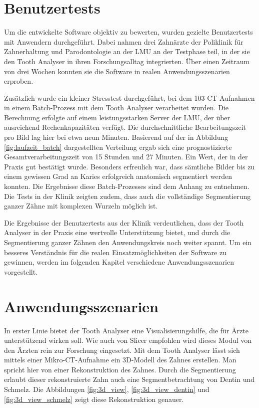\section{Benutzertests}
\label{sec:benutzertests}Um die entwickelte Software objektiv zu bewerten,
wurden gezielte Benutzertests mit Anwendern durchgeführt. Dabei nahmen drei Zahnärzte
der Poliklinik für Zahnerhaltung und Parodontologie an der LMU an der Testphase teil,
in der sie den Tooth Analyser in ihren Forschungsalltag integrierten. Über einen
Zeitraum von drei Wochen konnten sie die Software in realen Anwendungsszenarien erproben.

Zusätzlich wurde ein kleiner Stresstest durchgeführt, bei dem 103 \ac{CT}-Aufnahmen
in einem Batch-Prozess mit dem Tooth Analyser verarbeitet wurden. Die Berechnung
erfolgte auf einem leistungsstarken Server der LMU, der über ausreichend Rechenkapazitäten
verfügt. Die durchschnittliche Bearbeitungszeit pro Bild lag hier bei etwa neun
Minuten. Basierend auf der in Abbildung \ref{fig:laufzeit_batch} dargestellten Verteilung
ergab sich eine prognostizierte Gesamtverarbeitungszeit von 15 Stunden und 27 Minuten.
Ein Wert, der in der Praxis gut bestätigt wurde. Besonders erfreulich war, dass sämtliche
Bilder bis zu einem gewissen Grad an Karies erfolgreich anatomisch segmentiert werden
konnten. Die Ergebnisse diese Batch-Prozesses sind dem Anhang zu entnehmen. Die Tests
in der Klinik zeigten zudem, dass auch die vollständige Segmentierung ganzer
Zähne mit komplexen Wurzeln möglich ist.

Die Ergebnisse der Benutzertests aus der Klinik verdeutlichen, dass der Tooth Analyser
in der Praxis eine wertvolle Unterstützung bietet, und durch die Segmentierung
ganzer Zähnen den Anwendungskreis noch weiter spannt. Um ein besseres Verständnis
für die realen Einsatzmöglichkeiten der Software zu gewinnen, werden im
folgenden Kapitel verschiedene Anwendungsszenarien vorgestellt.

\section{Anwendungsszenarien}
In erster Linie bietet der Tooth Analyser eine Visualisierungshilfe, die für Ärzte
unterstützend wirken soll. Wie auch von Slicer empfohlen wird dieses Modul von
den Ärzten rein zur Forschung eingesetzt. Mit dem Tooth Analyser lässt sich mittels
einer Mikro-\ac{CT}-Aufnahme ein \ac{3D}-Modell des Zahnes erstellen. Man
spricht hier von einer Rekonstruktion des Zahnes. Durch die Segmentierung erlaubt
dieser rekonstruierte Zahn auch eine Segmentbetrachtung von Dentin und Schmelz.
Die Abbildungen \ref{fig:3d_view}, \ref{fig:3d_view_dentin} und \ref{fig:3d_view_schmelz}
zeigt diese Rekonstruktion genauer.

